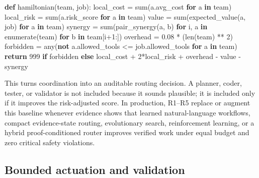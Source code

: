 \documentclass[11pt]{article}
\newenvironment{Shaded}{}{}
\newcommand{\BuiltInTok}[1]{\textcolor[rgb]{0.00,0.50,0.00}{#1}}
\newcommand{\ControlFlowTok}[1]{\textcolor[rgb]{0.00,0.44,0.13}{\textbf{#1}}}
\newcommand{\DecValTok}[1]{\textcolor[rgb]{0.25,0.63,0.44}{#1}}
\newcommand{\FloatTok}[1]{\textcolor[rgb]{0.25,0.63,0.44}{#1}}
\newcommand{\KeywordTok}[1]{\textcolor[rgb]{0.00,0.44,0.13}{\textbf{#1}}}
\newcommand{\NormalTok}[1]{#1}
\newcommand{\OperatorTok}[1]{\textcolor[rgb]{0.40,0.40,0.40}{#1}}
\begin{document}
\begin{Shaded}
\begin{Highlighting}[]
\KeywordTok{def}\NormalTok{ hamiltonian(team, job):}
\NormalTok{    local\_cost }\OperatorTok{=} \BuiltInTok{sum}\NormalTok{(a.avg\_cost }\ControlFlowTok{for}\NormalTok{ a }\KeywordTok{in}\NormalTok{ team)}
\NormalTok{    local\_risk }\OperatorTok{=} \BuiltInTok{sum}\NormalTok{(a.risk\_score }\ControlFlowTok{for}\NormalTok{ a }\KeywordTok{in}\NormalTok{ team)}
\NormalTok{    value }\OperatorTok{=} \BuiltInTok{sum}\NormalTok{(expected\_value(a, job) }\ControlFlowTok{for}\NormalTok{ a }\KeywordTok{in}\NormalTok{ team)}
\NormalTok{    synergy }\OperatorTok{=} \BuiltInTok{sum}\NormalTok{(pair\_synergy(a, b) }\ControlFlowTok{for}\NormalTok{ i, a }\KeywordTok{in} \BuiltInTok{enumerate}\NormalTok{(team) }\ControlFlowTok{for}\NormalTok{ b }\KeywordTok{in}\NormalTok{ team[i}\OperatorTok{+}\DecValTok{1}\NormalTok{:])}
\NormalTok{    overhead }\OperatorTok{=} \FloatTok{0.08} \OperatorTok{*}\NormalTok{ (}\BuiltInTok{len}\NormalTok{(team) }\OperatorTok{**} \DecValTok{2}\NormalTok{)}
\NormalTok{    forbidden }\OperatorTok{=} \BuiltInTok{any}\NormalTok{(}\KeywordTok{not}\NormalTok{ a.allowed\_tools }\OperatorTok{\textless{}=}\NormalTok{ job.allowed\_tools }\ControlFlowTok{for}\NormalTok{ a }\KeywordTok{in}\NormalTok{ team)}
    \ControlFlowTok{return} \DecValTok{999} \ControlFlowTok{if}\NormalTok{ forbidden }\ControlFlowTok{else}\NormalTok{ local\_cost }\OperatorTok{+} \DecValTok{2}\OperatorTok{*}\NormalTok{local\_risk }\OperatorTok{+}\NormalTok{ overhead }\OperatorTok{{-}}\NormalTok{ value }\OperatorTok{{-}}\NormalTok{ synergy}
\end{Highlighting}
\end{Shaded}

This turns coordination into an auditable routing decision. A planner,
coder, tester, or validator is not included because it sounds plausible;
it is included only if it improves the risk-adjusted score. In
production, R1--R5 replace or augment this baseline whenever evidence
shows that learned natural-language workflows, compact evidence-state
routing, evolutionary search, reinforcement learning, or a hybrid
proof-conditioned router improves verified work under equal budget and
zero critical safety violations.

\subsection{Bounded actuation and
validation}\label{bounded-actuation-and-validation}
\end{document}

